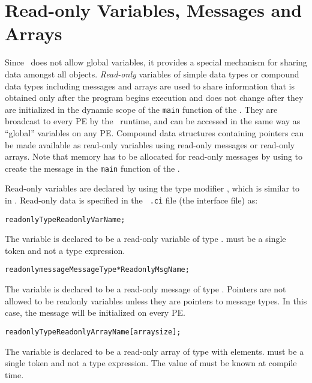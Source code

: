 \section{Read-only Variables, Messages and Arrays}
\label{readonly}

Since \charmpp\ does not allow global variables,
it provides a special mechanism for sharing
data amongst all objects. {\it Read-only} variables of simple data types or
compound data types including messages and arrays are used to share information
that is obtained only after the program begins execution and does not change
after they are initialized in the dynamic scope of the {\tt main} function of
the . They are broadcast to every PE by the \charmpp\ runtime,
and can be accessed in the same way as \CC ``global'' variables on any PE.
Compound data structures containing pointers can be made available as read-only
variables using read-only messages or read-only arrays.  Note that memory
has to be allocated for read-only messages by using  to create the
message in the {\tt main} function of the . 

Read-only variables are declared by using the type modifier ,
which is similar to  in \CC. Read-only data is specified in the {\tt
.ci} file (the interface file) as: 

\begin{alltt}
 readonly Type ReadonlyVarName;
\end{alltt}

The variable  is declared to be a read-only variable of
type .  must be a single token and not a type expression.

\begin{alltt}
 readonly message MessageType *ReadonlyMsgName;
\end{alltt}

The variable  is declared to be a read-only message of type
. Pointers are not allowed to be readonly variables unless they
are pointers to message types. In this case, the message will be initialized on
every PE.

\begin{alltt}
 readonly Type ReadonlyArrayName [arraysize];
\end{alltt}

The variable  is declared to be a read-only array of type
 with  elements.  must be a single token and
not a type expression. The value of  must be known at compile
time.

